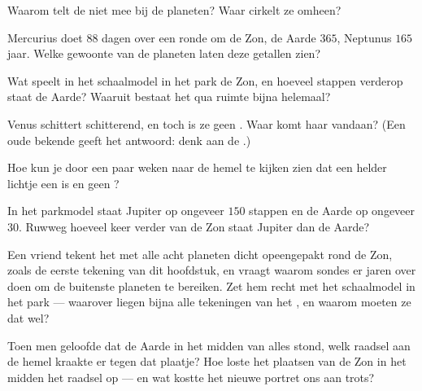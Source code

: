 \begin{exercise}[$\star$]\label{exo:g4:solar-system:4}
Waarom telt de  niet mee bij de planeten? Waar cirkelt ze
omheen?
\end{exercise}

\begin{exercise}[$\star$]\label{exo:g4:solar-system:5}
Mercurius doet $88$ dagen over een ronde om de Zon, de Aarde $365$,
Neptunus $165$ jaar. Welke gewoonte van de planeten laten deze
getallen zien?
\end{exercise}

\begin{exercise}[$\star$]\label{exo:g4:solar-system:6}
Wat speelt in het schaalmodel in het park de Zon, en hoeveel stappen
verderop staat de Aarde? Waaruit bestaat het  qua ruimte
bijna helemaal?
\end{exercise}

\begin{exercise}[$\star$]\label{exo:g4:solar-system:7}
Venus schittert schitterend, en toch is ze geen . Waar komt haar
 vandaan? (Een oude bekende geeft het antwoord: denk aan de
.)
\end{exercise}

\begin{exercise}[$\star$]\label{exo:g4:solar-system:8}
Hoe kun je door een paar weken naar de hemel te kijken zien dat een
helder lichtje een  is en geen ?
\end{exercise}

\begin{exercise}[$\star$]\label{exo:g4:solar-system:9}
In het parkmodel staat Jupiter op ongeveer $150$ stappen en de Aarde
op ongeveer $30$. Ruwweg hoeveel keer verder van de Zon staat Jupiter
dan de Aarde?
\end{exercise}

\begin{exercise}[$\star\star$]\label{exo:g4:solar-system:10}
Een vriend tekent het  met alle acht planeten dicht
opeengepakt rond de Zon, zoals de eerste tekening van dit hoofdstuk,
en vraagt waarom sondes er jaren over doen om de buitenste
planeten te bereiken. Zet hem recht met het schaalmodel in het park
--- waarover liegen bijna alle tekeningen van het
, en waarom moeten ze dat wel?
\end{exercise}

\begin{exercise}[$\star\star$]\label{exo:g4:solar-system:11}
Toen men geloofde dat de Aarde in het midden van alles stond, welk
raadsel aan de hemel kraakte er tegen dat plaatje? Hoe loste het
plaatsen van de Zon in het midden het raadsel op --- en wat kostte het
nieuwe portret ons aan trots?
\end{exercise}
